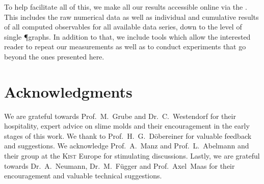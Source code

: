 		To help facilitate all of this, we make all our results accessible online via the \SMGR. This includes the raw numerical data as well as individual and cumulative results of all computed observables for all available data series, down to the level of single \P graphs. In addition to that, we include tools which allow the interested reader to repeat our measurements as well as to conduct experiments that go beyond the ones presented here.

	\section{Acknowledgments}

		We are grateful towards Prof.~M.~Grube and Dr.~C.~Westendorf for their hospitality, expert advice on slime molds and their encouragement in the early stages of this work. We thank to Prof.~H.~G.~D\"obereiner for valuable feedback and suggestions. We acknowledge Prof.~A.~Manz and Prof.~L.~Abelmann and their group at the \textsc{Kist} Europe for stimulating discussions. Lastly, we are grateful towards Dr.~A.~Neumann, Dr.~M.~F\"ugger and Prof.~Axel~Maas for their encouragement and valuable technical suggestions.

